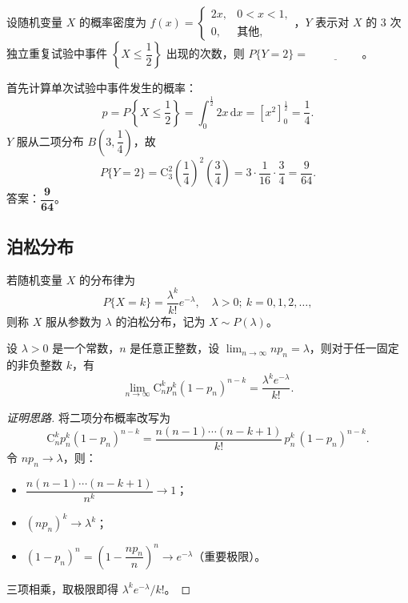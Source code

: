 \documentclass[lang=cn,11pt]{elegantbook}
\begin{document}
\begin{exercise}[概率密度与二项分布结合] \label{exer:2-41}
设随机变量 $X$ 的概率密度为 $f(x)=\begin{cases}2x, & 0<x<1, \\ 0, & \text{其他},\end{cases}$，$Y$ 表示对 $X$ 的 3 次独立重复试验中事件 $\left\{X\leqslant\dfrac{1}{2}\right\}$ 出现的次数，则 $P\{Y=2\}=\underline{\hspace{2cm}}$。
\end{exercise}
\begin{solution}
首先计算单次试验中事件发生的概率：
\[
p = P\left\{X\leqslant\frac{1}{2}\right\} = \int_0^{\frac{1}{2}}2x\,\mathrm{d}x = \left[x^2\right]_0^{\frac{1}{2}} = \frac{1}{4}.
\]
$Y$ 服从二项分布 $B\left(3,\dfrac{1}{4}\right)$，故
\[
P\{Y=2\} = \mathrm{C}_3^2\left(\frac{1}{4}\right)^2\left(\frac{3}{4}\right) = 3\cdot\frac{1}{16}\cdot\frac{3}{4} = \frac{9}{64}.
\]
答案：$\boldsymbol{\dfrac{9}{64}}$。
\end{solution}



\subsection{泊松分布} \label{subsec:poisson-dist}
\begin{definition}[泊松分布] \label{def:poisson-dist}
若随机变量 $X$ 的分布律为
\[
P\{X = k\} = \frac{\lambda^k}{k!} e^{-\lambda},\quad \lambda > 0;\ k=0,1,2,\dots,
\]
则称 $X$ 服从参数为 $\lambda$ 的泊松分布，记为 $X \sim P(\lambda)$。
\end{definition}

\begin{theorem}[泊松定理] \label{thm:poisson-approx}
设 $\lambda > 0$ 是一个常数，$n$ 是任意正整数，设 $\lim_{n \to \infty} np_n = \lambda$，则对于任一固定的非负整数 $k$，有
\[
\lim_{n \to \infty} \mathrm{C}_n^k p_n^k (1-p_n)^{n-k} = \frac{\lambda^k e^{-\lambda}}{k!}.
\]
\end{theorem}
\begin{proof}[证明思路]
将二项分布概率改写为
\[
\mathrm{C}_n^k p_n^k(1-p_n)^{n-k} = \frac{n(n-1)\cdots(n-k+1)}{k!}\,p_n^k\,(1-p_n)^{n-k}.
\]
令 \(np_n \to \lambda\)，则：
\begin{itemize}
    \item \(\dfrac{n(n-1)\cdots(n-k+1)}{n^k} \to 1\)；
    \item \(\left(np_n\right)^k \to \lambda^k\)；
    \item \((1-p_n)^n = \left(1-\dfrac{np_n}{n}\right)^n \to e^{-\lambda}\)（重要极限）。
\end{itemize}
三项相乘，取极限即得 \(\lambda^k e^{-\lambda}/k!\)。
\end{proof}
\end{document}
